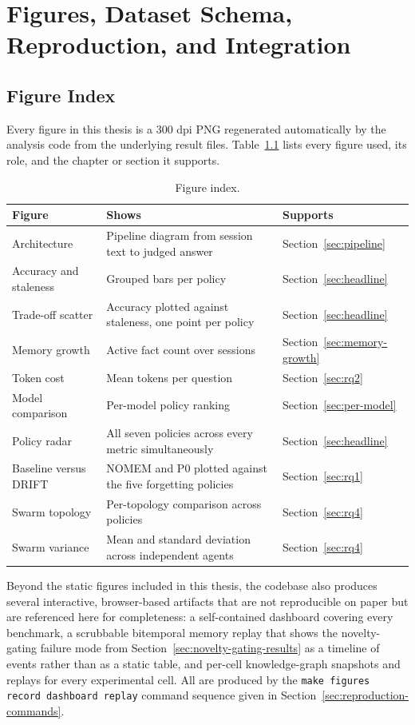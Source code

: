 \chapter{Figures, Dataset Schema, Reproduction, and Integration}
\label{app:reproduction}

\section{Figure Index}
\label{sec:figure-index}

Every figure in this thesis is a 300 dpi PNG regenerated automatically by the analysis code from the underlying result files. Table~\ref{tab:figure-index} lists every figure used, its role, and the chapter or section it supports.

\begin{table}[H]
\centering
\caption{Figure index.}
\label{tab:figure-index}
\small
\begin{tabular}{p{2.8cm}p{5.5cm}p{2.5cm}}
\toprule
Figure & Shows & Supports \\
\midrule
Architecture & Pipeline diagram from session text to judged answer & Section~\ref{sec:pipeline} \\
Accuracy and staleness & Grouped bars per policy & Section~\ref{sec:headline} \\
Trade-off scatter & Accuracy plotted against staleness, one point per policy & Section~\ref{sec:headline} \\
Memory growth & Active fact count over sessions & Section~\ref{sec:memory-growth} \\
Token cost & Mean tokens per question & Section~\ref{sec:rq2} \\
Model comparison & Per-model policy ranking & Section~\ref{sec:per-model} \\
Policy radar & All seven policies across every metric simultaneously & Section~\ref{sec:headline} \\
Baseline versus DRIFT & NOMEM and P0 plotted against the five forgetting policies & Section~\ref{sec:rq1} \\
Swarm topology & Per-topology comparison across policies & Section~\ref{sec:rq4} \\
Swarm variance & Mean and standard deviation across independent agents & Section~\ref{sec:rq4} \\
\bottomrule
\end{tabular}
\end{table}

Beyond the static figures included in this thesis, the codebase also produces several interactive, browser-based artifacts that are not reproducible on paper but are referenced here for completeness: a self-contained dashboard covering every benchmark, a scrubbable bitemporal memory replay that shows the novelty-gating failure mode from Section~\ref{sec:novelty-gating-results} as a timeline of events rather than as a static table, and per-cell knowledge-graph snapshots and replays for every experimental cell. All are produced by the \texttt{make figures record dashboard replay} command sequence given in Section~\ref{sec:reproduction-commands}.

